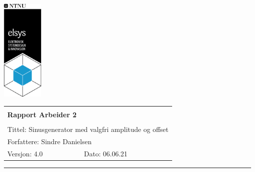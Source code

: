 \documentclass[a4paper,11pt,norsk]{article}
\begin{document}
\begin{minipage}[c]{0.15\textwidth}
\includegraphics[width=2.0cm]{img/elsys_pos_staaende_ntnu}  
\end{minipage}
\begin{minipage}[c]{0.85\textwidth}

\renewcommand{\arraystretch}{1.7}
\large 
\begin{tabularx}{\textwidth}{|X|X|}
\hline
\multicolumn{2}{|l|}{} \\
\multicolumn{2}{|l|}{\huge \textbf{Rapport Arbeider 2}} \\
\multicolumn{2}{|l|}{}  \\
\hline
\multicolumn{2}{|l|}{Tittel: 
Sinusgenerator med valgfri amplitude og offset
} \\
\hline
\multicolumn{2}{|l|}{Forfattere: 
Sindre Danielsen
} \\
\hline
Versjon: 4.0 & Dato: 06.06.21
\\
\hline 
\end{tabularx}
\end{minipage}
\normalsize


\setlength{\parskip}{0ex}
\renewcommand{\baselinestretch}{0.1}\normalsize
\tableofcontents
\renewcommand{\baselinestretch}{1.00}\normalsize
\setlength{\parskip}{2ex}
\rule{\textwidth}{1pt}

\newpage
\end{document}
